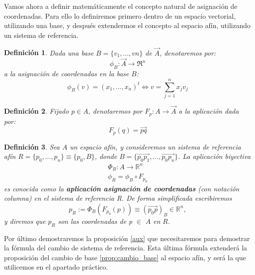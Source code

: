 \documentclass[a4paper,11pt, oneside]{book}
\newtheorem{defi}{Definición}
\begin{document}
Vamos ahora a definir matemáticamente el concepto natural de asignación de coordenadas. Para ello lo definiremos primero dentro de un espacio vectorial, utilizando una base, y después extendermos el concepto al espacio afín, utilizando un sistema de referencia.
\begin{defi}
	Dada una base $B = \{v_1,...,vn\}$ de $\overrightarrow{A}$, denotaremos por:
	\begin{equation}
		\phi_B : \overrightarrow{A} \rightarrow \Re^n
	\end{equation}
	a la asignación de coordenadas en la base $B$:
	\begin{equation}
		\phi_B(v) = (x_1,...,x_n)^t \Leftrightarrow v = \sum_{j=1}^{n}x_jv_j
	\end{equation}
\end{defi}
\begin{defi}
	Fijado $p \in A$, denotaremos por $F_p: A \rightarrow \overrightarrow{A}$ a la aplicación dada por:
	\begin{equation}
		F_p(q) = \overrightarrow{pq}
	\end{equation}
\end{defi}
\begin{defi}
	\label{asignacion}
	Sea $A$ un espacio afín, y consideremos un sistema de referencia afín $R = \{p_0,...,p_n\} \equiv \{p_0, B\}$, donde
	$B = \{\overrightarrow{p_0p_1},...,\overrightarrow{p_0p_n}\}$. La aplicación biyectiva
	\begin{equation}
	\begin{split}
	\Phi_R : A \rightarrow \mathbb R^n \\
	 \phi_R = \phi_B \circ F_{p_0}
	\end{split}
	\end{equation}
	es conocida como la \textbf{aplicación asignación de coordenadas} (con notación columna) en el sistema de referencia R. De forma simplificada escribiremos
	\begin{equation}
	p_R := \Phi_B(F_{p_0}(p)) \equiv (\overrightarrow{p_0p})_B \in \mathbb R^n, 
	\end{equation}
	y diremos que $p_R$ son las coordenadas de p $\in$ $A$ en $R$.
\end{defi}

Por último demostraremos la proposición \ref{aux} que necesitaremos para demostrar la fórmula del cambio de sistema de referencia. Esta última fórmula extenderá la proposición del cambio de base \ref{prop:cambio_base} al espacio afín, y será la que utilicemos en el apartado práctico.
\end{document}

